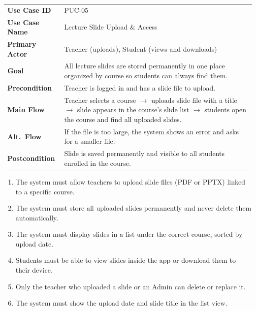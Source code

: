\documentclass[12pt,a4paper]{article}
\begin{document}
\begin{tcolorbox}[pucbox, title={Product Use Case --- PUC-05}]
\begin{tabularx}{\linewidth}{p{3.5cm} X}
\textbf{Use Case ID}    & PUC-05 \\
\textbf{Use Case Name}  & Lecture Slide Upload \& Access \\
\textbf{Primary Actor}  & Teacher (uploads), Student (views and downloads) \\
\textbf{Goal}           & All lecture slides are stored permanently in one place organized by course so students can always find them. \\
\textbf{Precondition}   & Teacher is logged in and has a slide file to upload. \\
\textbf{Main Flow}      & Teacher selects a course $\rightarrow$ uploads slide file with a title $\rightarrow$ slide appears in the course's slide list $\rightarrow$ students open the course and find all uploaded slides. \\
\textbf{Alt.\ Flow}     & If the file is too large, the system shows an error and asks for a smaller file. \\
\textbf{Postcondition}  & Slide is saved permanently and visible to all students enrolled in the course. \\
\end{tabularx}
\end{tcolorbox}

\begin{tcolorbox}[frbox, title={Functional Requirements --- PUC-05}]
\begin{enumerate}[leftmargin=*, label=\textbf{FR-05.\arabic*}, itemsep=5pt]
  \item The system must allow teachers to upload slide files (PDF or PPTX) linked to a specific course.
  \item The system must store all uploaded slides permanently and never delete them automatically.
  \item The system must display slides in a list under the correct course, sorted by upload date.
  \item Students must be able to view slides inside the app or download them to their device.
  \item Only the teacher who uploaded a slide or an Admin can delete or replace it.
  \item The system must show the upload date and slide title in the list view.
\end{enumerate}
\end{tcolorbox}
\end{document}
